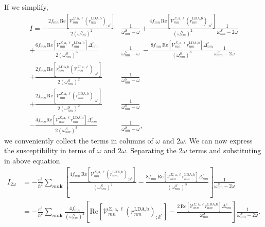 If we simplify,
\begin{align}\label{simplified_i} 
I =
-   \frac{2f_{mn}\,\mathrm{Re}\left[\mathcal{V}^{\Sigma,\text{a},\ell}_{mn}
    \left(r^{\text{LDA,b}}_{nm}\right)_{;k^{\text{c}}}\right]}
    {2(\omega^{S}_{nm})^{2}}&\frac{1}{\omega^{S}_{nm}-\omega}
+   \frac{4f_{mn}\,\mathrm{Re}\left[\mathcal{V}^{\Sigma,\text{a},\ell}_{mn}
    \left(r^{\text{LDA,b}}_{nm}\right)_{;k^{\text{c}}}\right]}
    {(\omega^{S}_{nm})^{2}}\frac{1}{\omega^{S}_{nm}-2\omega}\nonumber\\
+   \frac{6f_{mn}\,\mathrm{Re}\left[\mathcal{V}^{\Sigma,\text{a},\ell}_{mn}
    r^{\text{LDA,b}}_{nm}\right]
    \Delta^{\text{c}}_{nm}}{2(\omega^{S}_{nm})^{3}}
    &\frac{1}{\omega^{S}_{nm}-\omega} 
\,- \frac{8f_{mn}\,\mathrm{Re}\left[\mathcal{V}^{\Sigma,\text{a},\ell}_{mn}
    r^{\text{LDA,b}}_{nm}\right]\Delta^{\text{c}}_{nm}}{(\omega^{S}_{nm})^{3}}
    \frac{1}{\omega^{S}_{nm}-2\omega}\nonumber\\
+   \frac{2f_{mn}\,\mathrm{Re}\left[r^{\text{LDA,b}}_{nm}
    \left(\mathcal{V}^{\Sigma,\text{a},\ell}_{mn}\right)
    _{;k^{\text{c}}}\right]}{2(\omega^{S}_{nm})^{2}}
    &\frac{1}{\omega^{S}_{nm}-\omega}\nonumber\\
+   \frac{2f_{mn}\,\mathrm{Re}\left[\mathcal{V}^{\Sigma,\text{a},\ell}_{mn}
    \left(r^{\text{LDA,b}}_{nm}\right)_{;k^{\text{c}}}\right]}
    {2(\omega^{S}_{nm})^{2}}&\frac{1}{\omega^{S}_{nm}-\omega}\nonumber\\
-   \frac{4f_{mn}\mathrm{Re}\left[\mathcal{V}^{\Sigma,\text{a},\ell}_{nm}
    r^{\text{LDA,b}}_{mn}\right]\Delta_{nm}^{\text{c}}}{2(\omega^{S}_{nm})^{3}}
    &\frac{1}{\omega^{S}_{nm}-\omega}
,
\end{align}
we conveniently collect the terms in columns of $\omega$ and $2\omega$. 
We can now express the susceptibility in terms of $\omega$ and $2\omega$. 
Separating the $2\omega$ terms and substituting in above equation
\begin{align}\label{2wchii}
I_{2\omega}
&=  -\frac{e^{3}}{\hbar^2}\sum_{mn\mathbf{k}}\left[\frac{4f_{mn}\,\mathrm{Re}
    \left[\mathcal{V}^{\Sigma,\text{a},\ell}_{mn}
    \left(r^{\text{LDA,b}}_{nm}\right)_{;k^{\text{c}}}\right]}
    {(\omega^{S}_{nm})^{2}} - \frac{8f_{mn}\,\mathrm{Re}
    \left[\mathcal{V}^{\Sigma,\text{a},\ell}_{mn}r^{\text{LDA,b}}_{nm}\right]
    \Delta^{\text{c}}_{nm}}{(\omega^{S}_{nm})^{3}}\right]
    \frac{1}{\omega^{S}_{nm}-2\omega}\nonumber\\
&=  -\frac{e^3}{\hbar^2}\sum_{mn\mathbf{k}}
    \frac{4f_{mn}}{(\omega^{S}_{nm})^{2}}
    \left[\mathrm{Re}\left[\mathcal{V}^{\Sigma,\text{a},\ell}_{mn}
    \left(r^{\text{LDA,b}}_{nm}\right)_{;k^{\text{c}}}\right] 
-   \frac{2\,\mathrm{Re}\left[\mathcal{V}^{\Sigma,\text{a},\ell}_{mn}
    r^{\text{LDA,b}}_{nm}\right]\Delta^{\text{c}}_{nm}}{\omega^{S}_{nm}}\right]
    \frac{1}{\omega^{S}_{nm}-2\omega}
.
\end{align}

